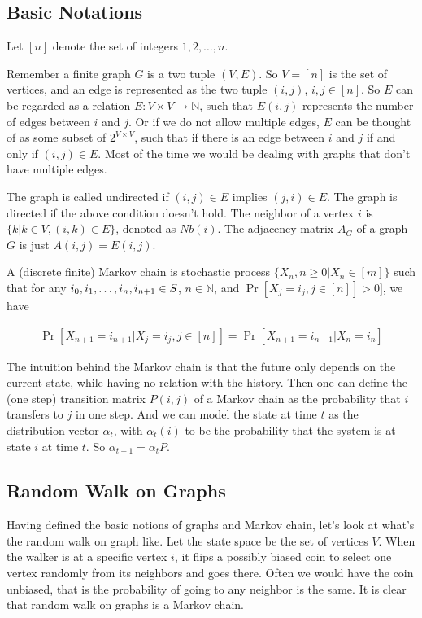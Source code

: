 \subsection{Basic Notations}
Let $[n]$ denote the set of integers ${1, 2, \dots, n}$.

Remember a finite graph $G$ is a two tuple $(V, E)$. So
$V=[n]$ is the set of vertices, and an edge is represented as the two tuple $(i, j)$, $i, j\in[n]$.
So $E$ can be regarded as a relation $E: V\times V \rightarrow \mathbb{N}$, such that $E(i, j)$
represents the number of edges between $i$ and $j$. Or if we do not allow multiple edges, $E$
can be thought of as some subset of $2^{V\times V}$, such that if there is an edge between
$i$ and $j$ if and only if $(i, j)\in E$. Most of the time we would be dealing with
graphs that don't have multiple edges.

The graph is called undirected if $(i, j)\in E$ implies $(j, i)\in E$. The graph
is directed if the above condition doesn't hold. The neighbor of a vertex $i$ is $\{k|k\in V,
(i, k)\in E\}$, denoted as $Nb(i)$. The adjacency matrix $A_G$ of a graph $G$ is just
$A(i, j)=E(i, j)$.

A (discrete finite) Markov chain is stochastic process $\{X_n, n\geq 0|X_n\in [m]\}$ such that
for any $i_0, i_1, \dots, i_n, \\ i_{n+1}\in S$, $n\in \mathbb{N}$, and $\Pr [X_j=i_j, j\in [n]]>0]$,
we have

\begin{eqnarray*}
\Pr [X_{n+1}=i_{n+1}|X_j=i_j, j\in [n]]=\Pr [X_{n+1}=i_{n+1}|X_n=i_n]
\end{eqnarray*}

The intuition behind the Markov chain is that the future only depends on the current
state, while having no relation with the history. Then one can define the (one step) transition
matrix $P(i, j)$ of a Markov chain as the probability that $i$ transfers to $j$ in one step.
And we can model the state at time $t$ as the distribution vector $\alpha_t$, with $\alpha_t(i)$
to be the probability that the system is at state $i$ at time $t$. So $\alpha_{t+1}=\alpha_t P$.

\subsection{Random Walk on Graphs}

Having defined the basic notions of graphs and Markov chain, let's look at what's the
random walk on graph like. Let the state space be the set of vertices $V$. When
the walker is at a specific vertex $i$, it flips a possibly biased coin to
select one vertex randomly from its neighbors and
goes there. Often we would have the coin unbiased, that is the probability of going
to any neighbor is the same. It is clear that random walk on graphs is a Markov chain.

